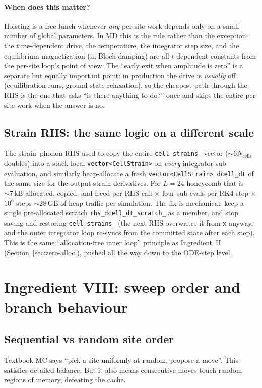 \documentclass[11pt,letterpaper]{article}
\begin{document}
\paragraph{When does this matter?}  Hoisting is a free lunch whenever
\emph{any} per-site work depends only on a small number of global
parameters.  In MD this is the rule rather than the exception: the
time-dependent drive, the temperature, the integrator step size, and
the equilibrium magnetization (in Bloch damping) are all
$t$-dependent constants from the per-site loop's point of view.  The
``early exit when amplitude is zero'' is a separate but equally
important point: in production the drive is \emph{usually} off
(equilibration runs, ground-state relaxation), so the cheapest path
through the RHS is the one that asks ``is there anything to do?''
once and skips the entire per-site work when the answer is no.

\subsection{Strain RHS: the same logic on a different scale}
\label{sec:strain-rhs}
The strain--phonon RHS used to copy the entire \texttt{cell\_strains\_}
vector ($\sim 6 N_{\text{cells}}$ doubles) into a stack-local
\texttt{vector<CellStrain>} on \emph{every} integrator sub-evaluation,
and similarly heap-allocate a fresh \texttt{vector<CellStrain>
dcell\_dt} of the same size for the output strain derivatives.  For
$L = 24$ honeycomb that is $\sim 7\,\mathrm{kB}$ allocated, copied,
and freed per RHS call $\times$ four sub-evals per RK4 step $\times$
$10^{6}$ steps $\sim 28\,\mathrm{GB}$ of heap traffic per simulation.
The fix is mechanical: keep a single pre-allocated scratch
\texttt{rhs\_dcell\_dt\_scratch\_} as a member, and stop saving and
restoring \texttt{cell\_strains\_} (the next RHS overwrites it from
\texttt{x} anyway, and the outer integrator loop re-syncs from the
committed state after each step).  This is the same ``allocation-free
inner loop'' principle as Ingredient~II
(Section~\ref{sec:zero-alloc}), pushed all the way down to the
ODE-step level.

\section{Ingredient VIII: sweep order and branch behaviour}

\subsection{Sequential vs random site order}
Textbook MC says ``pick a site uniformly at random, propose a move''.
This satisfies detailed balance.  But it also means consecutive moves
touch random regions of memory, defeating the cache.
\end{document}
